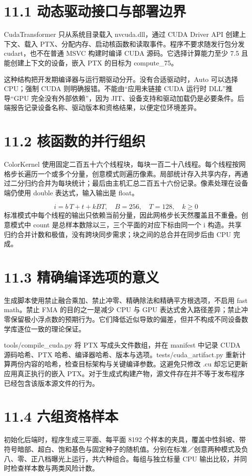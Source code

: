 \documentclass[UTF8,zihao=-4,openany]{ctexbook}
\begin{document}
\section*{11.1 动态驱动接口与部署边界}
CudaTransformer 只从系统目录载入 nvcuda.dll，通过 CUDA Driver API 创建上下文、载入 PTX、分配内存、启动核函数和读取事件。程序不要求随发行包分发 cudart，也不在普通 MSVC 构建时编译 CUDA 源码。它选择计算能力至少 7.5 且能创建上下文的设备，嵌入 PTX 的目标为 compute\_75。

这种结构把开发期编译器与运行期驱动分开。没有合适驱动时，Auto 可以选择 CPU；强制 CUDA 则明确报错。不能由“应用未链接 CUDA 运行时 DLL”推导“GPU 完全没有外部依赖”，因为 JIT、设备支持和驱动加载仍是必要条件。后端报告记录设备名称、驱动版本和资格结果，以便定位环境差异。


\section*{11.2 核函数的并行组织}
ColorKernel 使用固定二百五十六个线程块，每块一百二十八线程。每个线程按网格步长遍历一个或多个分量，创意模式则遍历像素。局部统计存入共享内存，再通过二分归约合并为每块统计；最后由主机汇总二百五十六份记录。像素处理在设备端仍使用 double 表达式，输入输出是 float。


\begin{equation}
i=b\,T+t+kBT,\quad B=256,\quad T=128,\quad k\geq0
\end{equation}
标准模式中每个线程的输出只依赖当前分量，因此网格步长天然覆盖且不重叠。创意模式中 count 是总样本数除以三，三个平面的对应下标由同一个 i 构造。共享归约合并计数和极值，没有跨块同步需求；块之间的总合并在同步后由 CPU 完成。


\section*{11.3 精确编译选项的意义}
生成脚本使用禁止融合乘加、禁止冲零、精确除法和精确平方根选项，不启用 fast math。禁止 FMA 的目的之一是减少 CPU 与 GPU 表达式舍入路径差异；禁止冲零保留极小浮点数的预期行为。它们降低近似导致的偏差，但并不构成不同设备数学库逐位一致的理论保证。

tools/compile\_cuda.py 将 PTX 写成头文件数组，并在 manifest 中记录 CUDA 源码哈希、PTX 哈希、编译器哈希、版本与选项。tests/cuda\_artifact.py 重新计算两份内容的哈希，检查目标架构与关键编译参数。这避免只修改 .cu 却忘记更新应用真正执行的嵌入 PTX。对于生成式构建产物，源文件存在并不等于发布程序已经包含该版本源文件的行为。


\section*{11.4 六组资格样本}
初始化后端时，程序生成三平面、每平面 8192 个样本的夹具，覆盖中性斜坡、带符号暗部、超白、饱和基色与固定种子的随机值。分别在标准／创意两种模式及负八、零、正八档曝光上运行，共六种组合。每组与独立标量 CPU 输出比较，并同时检查样本数与两类风险计数。
\end{document}
